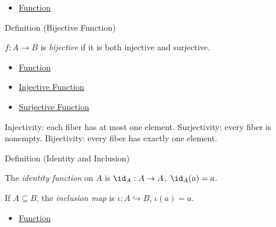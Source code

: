 \begin{dependencies}
\begin{itemize}
  \item \hyperref[def:function]{Function}
\end{itemize}
\end{dependencies}

\begin{definitionbox}{Definition (Bijective Function)}
\begin{definition}\label{def:bijective}
$f : A \to B$ is \emph{bijective} if it is both injective and surjective.
\end{definition}
\end{definitionbox}

\begin{dependencies}
\begin{itemize}
  \item \hyperref[def:function]{Function}
  \item \hyperref[def:injective]{Injective Function}
  \item \hyperref[def:surjective]{Surjective Function}
\end{itemize}
\end{dependencies}

\begin{remark*}
Injectivity: each fiber has at most one element. Surjectivity: every fiber is
nonempty. Bijectivity: every fiber has exactly one element.
\end{remark*}

\begin{definitionbox}{Definition (Identity and Inclusion)}
\begin{definition}\label{def:identity}
The \emph{identity function} on $A$ is $\id_A : A \to A$, $\id_A(a) = a$.

If $A \subseteq B$, the \emph{inclusion map} is $\iota : A \hookrightarrow B$,
$\iota(a) = a$.
\end{definition}
\end{definitionbox}

\begin{dependencies}
\begin{itemize}
  \item \hyperref[def:function]{Function}
\end{itemize}
\end{dependencies}

